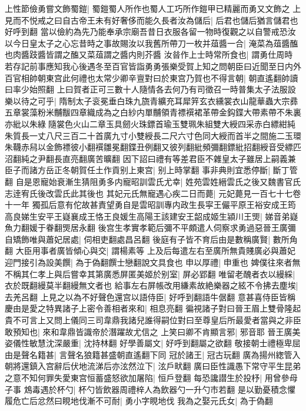 上性節儉勇嘗文飾蜀鎧|{
	蜀鎧蜀人所作也蜀人工巧所作鎧甲已精麗而勇又文飾之}
上見而不悦戒之曰自古帝王未有好奢侈而能久長者汝為儲后|{
	后君也儲后猶言儲君也好呼到翻}
當以儉約為先乃能奉承宗廟吾昔日衣服各留一物時復觀之以自警戒恐汝以今日皇太子之心忘昔時之事故賜汝以我舊所帶刀一枚并葅醬一合|{
	淹菜為葅醬醢也肉醬跂醬皆謂之醢又菜葅謂之醬内則芥醬}
汝㫺作上士時常所食也|{
	謂勇仕周時}
若存記前事應知我心後遇冬至百官皆詣勇勇張樂受賀上知之問朝臣曰近聞至日内外百官相帥朝東宫此何禮也太常少卿辛亶對曰於東宫乃賀也不得言朝|{
	朝直遙翻帥讀曰率少始照翻}
上曰賀者正可三數十人隨情各去何乃有司徵召一時普集太子法服設樂以待之可乎|{
	隋制太子衮冕垂白珠九旒青纊充耳犀笄玄衣纁裳衣山龍華蟲大宗彞五章裳藻粉米黼黻四章織成為之白紗内單黼領青褾襈裙革帶金鈎鍱大帶素帶不朱裏亦紕以朱綠隨裳色火山二章玉具劒火珠鏢首瑜玉雙珮朱組雙大綬四采赤白縹紺純朱質長一丈八尺三百二十首廣九寸小雙綬長二尺六寸色同大綬而首半之間施二玉環朱韈赤舄以金飾褾彼小翻襈雛冕翻鍱丑例翻又彼列翻紕頻彌翻鏢紕招翻綬音受縹匹沼翻純之尹翻長直亮翻廣苦曠翻}
因下詔曰禮有等差君臣不雜皇太子雖居上嗣義兼臣子而諸方岳正冬朝賀任土作貢别上東宫|{
	别上時掌翻}
事非典則宜悉停斷|{
	斷丁管翻}
自是恩寵始衰漸生猜阻勇多内寵昭訓雲氏尤幸|{
	姓苑雲姓縉雲氏之後又魏書官氏志逹宥氏後改雲氏此其後也}
其妃元氏無寵遇心疾二日而薨|{
	元妃薨見一百七十七卷十一年}
獨孤后意有佗故甚責望勇自是雲昭訓專内政生長寜王儼平原王裕安成王筠高良娣生安平王嶷襄成王恪王良媛生高陽王該建安王韶成姬生潁川王煚|{
	娣音弟嶷魚力翻媛于眷翻煚居永翻}
後宫生孝實孝範后彌不平頗遣人伺察求勇過惡晉王廣彌自矯飾唯與蕭妃居處|{
	伺相吏翻處昌呂翻}
後庭有子皆不育后由是數稱廣賢|{
	數所角翻}
大臣用事者廣皆傾心與交|{
	謂楊素等}
上及后每遣左右至廣所無貴賤廣必與蕭妃迎門接引為設美饌|{
	為于偽翻饌士戀翻說文具食也}
申以厚禮|{
	申重也}
婢僕往來者無不稱其仁孝上與后嘗幸其第廣悉屏匿美姬於别室|{
	屏必郢翻}
唯留老醜者衣以縵綵|{
	衣於既翻縵莫半翻縵無文者也}
給事左右屏帳改用縑素故絶樂器之絃不令拂去塵埃|{
	去羌呂翻}
上見之以為不好聲色還宫以語侍臣|{
	好呼到翻語牛倨翻}
意甚喜侍臣皆稱慶由是愛之特異諸子上密令善相者來和|{
	相息亮翻}
徧視諸子對曰晉王眉上雙骨隆起貴不可言上又問上儀同三司韋鼎我諸兒誰得嗣位對曰至尊皇后所最愛者當與之非臣敢預知也|{
	來和韋鼎皆識帝於潛躍故尤信之}
上笑曰卿不肯顯言邪|{
	邪音耶}
晉王廣美姿儀性敏慧沈深嚴重|{
	沈持林翻}
好學善屬文|{
	好呼到翻屬之欲翻}
敬接朝士禮極卑屈由是聲名籍甚|{
	言聲名狼籍甚盛朝直遙翻下同}
冠於諸王|{
	冠古玩翻}
廣為揚州緫管入朝將還鎮入宫辭后伏地流涕后亦泫然泣下|{
	泫戶畎翻}
廣曰臣性識愚下常守平生昆弟之意不知何罪失愛東宫恒蓄盛怒欲加屠陷|{
	恒戶登翻}
每恐讒譛生於投杼|{
	用曾參母子事}
鴆毒遇於杯勺|{
	杯勺皆飲器周禮梓人為飲器勺一升勺市若翻}
是以勤憂積念懼履危亡后忿然曰睍地伐漸不可耐|{
	勇小字睍地伐}
我為之娶元氏女|{
	為于偽翻}
